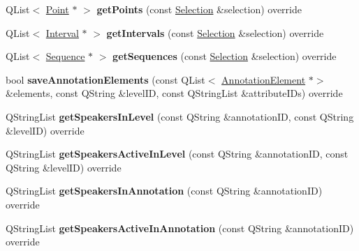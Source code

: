 \begin{DoxyCompactItemize}
Q\+List$<$ \hyperlink{class_point}{Point} $\ast$ $>$ {\bfseries get\+Points} (const \hyperlink{class_annotation_datastore_1_1_selection}{Selection} \&selection) override
\item 
\mbox{\label{class_s_q_l_annotation_datastore_a4466878ef7ac99d3bfb0befcbc74435b}} 
Q\+List$<$ \hyperlink{class_interval}{Interval} $\ast$ $>$ {\bfseries get\+Intervals} (const \hyperlink{class_annotation_datastore_1_1_selection}{Selection} \&selection) override
\item 
\mbox{\label{class_s_q_l_annotation_datastore_a9b4bd0fc99fe23cc17931db731988617}} 
Q\+List$<$ \hyperlink{class_sequence}{Sequence} $\ast$ $>$ {\bfseries get\+Sequences} (const \hyperlink{class_annotation_datastore_1_1_selection}{Selection} \&selection) override
\item 
\mbox{\label{class_s_q_l_annotation_datastore_aedb034b625f93093244e4c0057052b8c}} 
bool {\bfseries save\+Annotation\+Elements} (const Q\+List$<$ \hyperlink{class_annotation_element}{Annotation\+Element} $\ast$$>$ \&elements, const Q\+String \&level\+ID, const Q\+String\+List \&attribute\+I\+Ds) override
\item 
\mbox{\label{class_s_q_l_annotation_datastore_a848c2b022375b0900ff72120aadbdc85}} 
Q\+String\+List {\bfseries get\+Speakers\+In\+Level} (const Q\+String \&annotation\+ID, const Q\+String \&level\+ID) override
\item 
\mbox{\label{class_s_q_l_annotation_datastore_ad2f94e4c7834cb8c3d3e8436dca556ca}} 
Q\+String\+List {\bfseries get\+Speakers\+Active\+In\+Level} (const Q\+String \&annotation\+ID, const Q\+String \&level\+ID) override
\item 
\mbox{\label{class_s_q_l_annotation_datastore_a34fe173c5d4b1ed44ebc93844b99e73b}} 
Q\+String\+List {\bfseries get\+Speakers\+In\+Annotation} (const Q\+String \&annotation\+ID) override
\item 
\mbox{\label{class_s_q_l_annotation_datastore_aff3ca1ebe6dd507e8830945a80cf0318}} 
Q\+String\+List {\bfseries get\+Speakers\+Active\+In\+Annotation} (const Q\+String \&annotation\+ID) override
$$
\end{DoxyCompactItemize}

